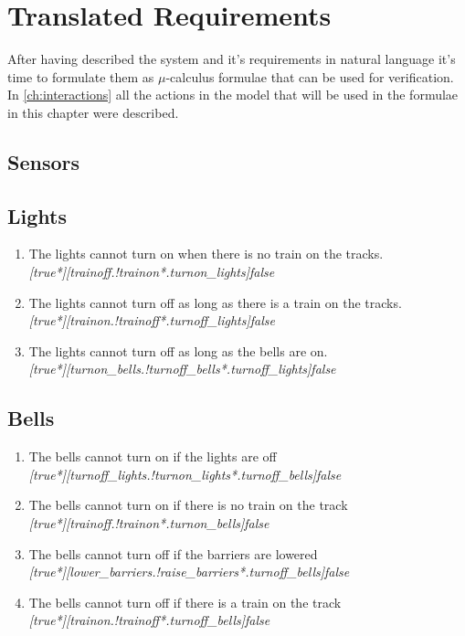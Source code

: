 \documentclass[final]{report}
\begin{document}
\chapter{Translated Requirements}
After having described the system and it's requirements in natural language it's time to formulate them as $\mu$-calculus formulae that can be used for verification. In \cref{ch:interactions} all the actions in the model that will be used in the formulae in this chapter were described.

\section{Sensors}

\section{Lights}
\begin{enumerate}
\item The lights cannot turn on when there is no train on the tracks.\\
\textit{[true*][trainoff.!trainon*.turnon\_lights]false}

\item The lights cannot turn off as long as there is a train on the tracks.\\
\textit{[true*][trainon.!trainoff*.turnoff\_lights]false}

\item The lights cannot turn off as long as the bells are on.\\
\textit{[true*][turnon\_bells.!turnoff\_bells*.turnoff\_lights]false}
\end{enumerate}

\section{Bells}
\begin{enumerate}
\item The bells cannot turn on if the lights are off\\
\textit{[true*][turnoff\_lights.!turnon\_lights*.turnoff\_bells]false}
\item The bells cannot turn on if there is no train on the track\\
\textit{[true*][trainoff.!trainon*.turnon\_bells]false}
\item The bells cannot turn off if the barriers are lowered\\
\textit{[true*][lower\_barriers.!raise\_barriers*.turnoff\_bells]false}
\item The bells cannot turn off if there is a train on the track\\
\textit{[true*][trainon.!trainoff*.turnoff\_bells]false}
\end{enumerate}
\end{document}
